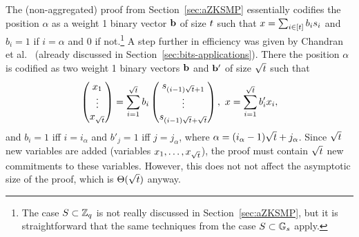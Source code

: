 The (non-aggregated) proof from Section~\ref{sec:aZKSMP} essentially codifies the position \(\alpha\) as a weight 1 binary vector \(\mathbf{b}\) of size \(t \) such that \(x=\sum_{i\in[t ]}b_is_i\) and
\(b_i=1\) if \(i=\alpha\) and \(0\) if not.\footnote{The case \(S\subset\mathbb{Z}_q\) is not really discussed in Section~\ref{sec:aZKSMP}, but it is straightforward that the same techniques from the case \(S\subset\mathbb{G}_s\) apply.} A step further in efficiency was given by Chandran et al.~\cite{ICALP:ChaGroSah07} (already discussed in Section~\ref{sec:bits-applications}). There the position \(\alpha\) is codified as two weight 1 binary vectors \(\mathbf{b}\) and \(\mathbf{b}'\) of size \(\sqrt{t }\) such that
\[
\begin{pmatrix}
x_1\\\vdots\\x_{\sqrt{t }}
\end{pmatrix}
=\sum_{i=1}^{\sqrt{t }}b_i
\begin{pmatrix}
s_{(i-1)\sqrt{t }+1}\\\vdots\\s_{(i-1)\sqrt{t }+\sqrt{t }}
\end{pmatrix},
\text{ } x=\sum_{i=1}^{\sqrt{t }}b'_ix_i,\]
and \(b_i=1\) iff \(i=i_\alpha\) and \(b'_j=1\) iff \(j=j_\alpha\), where \(\alpha=(i_\alpha-1)\sqrt{t }+j_\alpha\). Since \(\sqrt{t }\) new variables are added (variables \(x_1,\ldots,x_{\sqrt{t }}\)), the proof must contain \(\sqrt{t }\) new commitments to these variables. However, this does not not affect the asymptotic size of the proof, which is \(\Theta(\sqrt{t })\) anyway.


